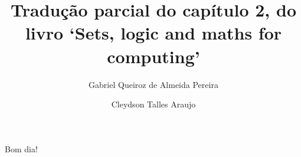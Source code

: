 
  \title{Tradução parcial do capítulo 2, do livro `Sets, logic and maths for computing'}
  \author{Gabriel Queiroz de Almeida Pereira}
  \author{Cleydson Talles Araujo}
  
  \maketitle
  Bom dia!
    